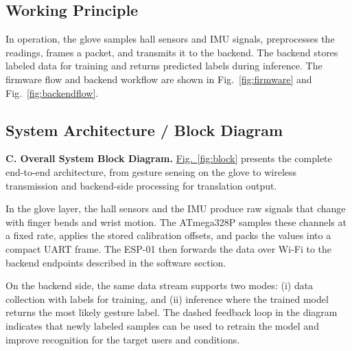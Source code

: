 \documentclass[conference]{IEEEtran}
\newcommand{\FigLink}[1]{\hyperref[#1]{Fig.~\ref*{#1}}}
\begin{document}
\subsection{Working Principle}
In operation, the glove samples hall sensors and IMU signals, preprocesses the readings, frames a packet, and transmits it to the backend. The backend stores labeled data for training and returns predicted labels during inference. The firmware flow and backend workflow are shown in Fig.~\ref{fig:firmware} and Fig.~\ref{fig:backendflow}.

\subsection{System Architecture / Block Diagram}
\noindent\textbf{C. Overall System Block Diagram.}
\FigLink{fig:block} presents the complete end-to-end architecture, from gesture sensing on the glove to wireless transmission and backend-side processing for translation output.

In the glove layer, the hall sensors and the IMU produce raw signals that change with finger bends and wrist motion. The ATmega328P samples these channels at a fixed rate, applies the stored calibration offsets, and packs the values into a compact UART frame. The ESP-01 then forwards the data over Wi-Fi to the backend endpoints described in the software section.

On the backend side, the same data stream supports two modes: (i) data collection with labels for training, and (ii) inference where the trained model returns the most likely gesture label. The dashed feedback loop in the diagram indicates that newly labeled samples can be used to retrain the model and improve recognition for the target users and conditions.
\end{document}
